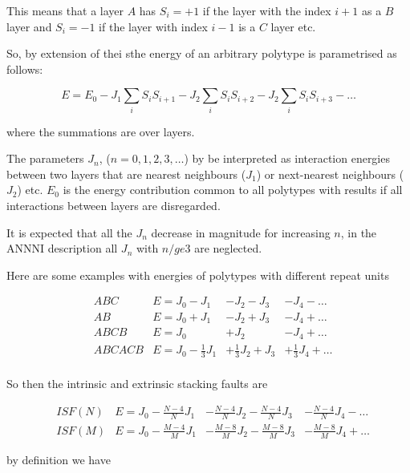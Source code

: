 \documentclass[11pt]{article}
\begin{document}
\begin{enumerate}
\begin{enumerate}
\begin{enumerate}
This means that a layer \(A\) has \(S_i = +1\) if the layer with the index \(i+1\)
as a \(B\) layer and \(S_i = -1\) if the layer with index \(i-1\) is a \(C\) layer
etc. 

So, by extension of thei sthe energy of an arbitrary polytype is parametrised
as follows:

\begin{LaTeX}
\[
E = E_{0} - J_{1} \sum_{i} S_{i} S_{i+1} - J_{2}\sum_{i} S_{i}S_{i+2} - J_{2}\sum_{i} S_{i}S_{i+3} - \ldots
\]
\end{LaTeX}

where the summations are over layers. 

The parameters \(J_n\), (\(n=0,1,2,3,\ldots\)) by be interpreted as interaction
energies between two layers that are nearest neighbours (\(J_1\)) or
next-nearest neighbours (\(J_2\)) etc. \(E_0\) is the energy contribution common
to all polytypes with results if all interactions between layers are
disregarded.

It is expected that all the \(J_n\) decrease in magnitude for increasing \(n\), in
the ANNNI description all \(J_n\) with \(n /ge 3\) are neglected. 

Here are some examples with energies of polytypes with different repeat units

\begin{LaTeX}
\begin{align}
&ABC     &E = J_0 - J_1 &- J_2 - J_3 &- J_4 - \ldots \\
&AB      &E = J_0 + J_1 &- J_2 + J_3 &- J_4 + \ldots \\
&ABCB    &E = J_0       &+ J_2       &- J_4 + \ldots \\
&ABCACB  &E = J_0 - \frac{1}{3}J_1 &+ \frac{1}{3}J_2 + J_3 &+ \frac{1}{3}J_4 + \ldots \\
\end{align}
\end{LaTeX}

So then the intrinsic and extrinsic stacking faults are
\begin{LaTeX}
\begin{align}
&ISF(N)     &E = J_0 - \frac{N-4}{N}J_1 &- \frac{N-4}{N}J_2 - \frac{N-4}{N}J_3 &- \frac{N-4}{N}J_4 - \ldots \\
&ISF(M)     &E = J_0 - \frac{M-4}{M}J_1 &- \frac{M-8}{M}J_2 - \frac{M-8}{M}J_3 &- \frac{M-8}{M}J_4 + \ldots 
\end{align}
\end{LaTeX}

by definition we have 


\end{enumerate}
\end{enumerate}
\end{enumerate}
\end{document}
